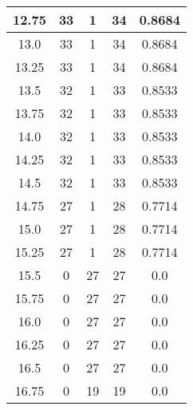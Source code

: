 \documentclass[letterpaper, 12pt]{article}
\begin{document}
\begin{longtable}{|c|c|c|c|c|}
\hline
12.75 & 33 & 1 & 34 & 0.8684 \\
\hline
13.0 & 33 & 1 & 34 & 0.8684 \\
\hline
13.25 & 33 & 1 & 34 & 0.8684 \\
\hline
13.5 & 32 & 1 & 33 & 0.8533 \\
\hline
13.75 & 32 & 1 & 33 & 0.8533 \\
\hline
14.0 & 32 & 1 & 33 & 0.8533 \\
\hline
14.25 & 32 & 1 & 33 & 0.8533 \\
\hline
14.5 & 32 & 1 & 33 & 0.8533 \\
\hline
14.75 & 27 & 1 & 28 & 0.7714 \\
\hline
15.0 & 27 & 1 & 28 & 0.7714 \\
\hline
15.25 & 27 & 1 & 28 & 0.7714 \\
\hline
15.5 & 0 & 27 & 27 & 0.0 \\
\hline
15.75 & 0 & 27 & 27 & 0.0 \\
\hline
16.0 & 0 & 27 & 27 & 0.0 \\
\hline
16.25 & 0 & 27 & 27 & 0.0 \\
\hline
16.5 & 0 & 27 & 27 & 0.0 \\
\hline
16.75 & 0 & 19 & 19 & 0.0 \\
\hline
\end{longtable}
\end{document}
